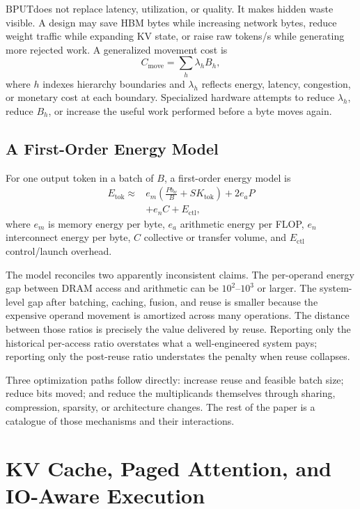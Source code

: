 \documentclass[journal]{IEEEtran}
\newcommand{\BPUT}{\ensuremath{\mathrm{BPUT}}}
\begin{document}
\BPUT does not replace latency, utilization, or quality. It makes hidden waste visible. A design may save HBM bytes while increasing network bytes, reduce weight traffic while expanding KV state, or raise raw tokens/s while generating more rejected work. A generalized movement cost is
\begin{equation}
C_{\mathrm{move}}=\sum_h \lambda_h B_h,
\label{eq:movement-cost}
\end{equation}
where $h$ indexes hierarchy boundaries and $\lambda_h$ reflects energy, latency, congestion, or monetary cost at each boundary. Specialized hardware attempts to reduce $\lambda_h$, reduce $B_h$, or increase the useful work performed before a byte moves again.

\subsection{A First-Order Energy Model}
For one output token in a batch of $B$, a first-order energy model is
\begin{equation}
\begin{aligned}
E_{\mathrm{tok}}\approx {}& e_m\left(\frac{Pb_w}{B}+S K_{\mathrm{tok}}\right) + 2e_aP \\
& + e_n C + E_{\mathrm{ctl}},
\end{aligned}
\label{eq:energy-token}
\end{equation}
where $e_m$ is memory energy per byte, $e_a$ arithmetic energy per FLOP, $e_n$ interconnect energy per byte, $C$ collective or transfer volume, and $E_{\mathrm{ctl}}$ control/launch overhead.

The model reconciles two apparently inconsistent claims. The per-operand energy gap between DRAM access and arithmetic can be $10^2$--$10^3$ or larger. The system-level gap after batching, caching, fusion, and reuse is smaller because the expensive operand movement is amortized across many operations. The distance between those ratios is precisely the value delivered by reuse. Reporting only the historical per-access ratio overstates what a well-engineered system pays; reporting only the post-reuse ratio understates the penalty when reuse collapses.

Three optimization paths follow directly: increase reuse and feasible batch size; reduce bits moved; and reduce the multiplicands themselves through sharing, compression, sparsity, or architecture changes. The rest of the paper is a catalogue of those mechanisms and their interactions.

\section{KV Cache, Paged Attention, and IO-Aware Execution}
\end{document}
